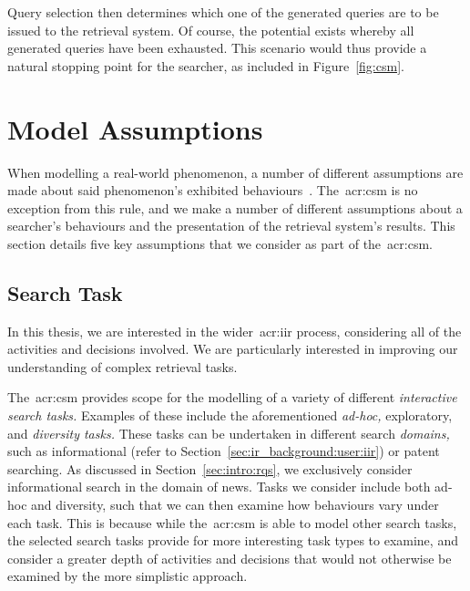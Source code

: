 Query selection then determines which one of the generated queries are to be issued to the retrieval system. Of course, the potential exists whereby all generated queries have been exhausted. This scenario would thus provide a natural stopping point for the searcher, as included in Figure~\ref{fig:csm}.

\section{Model Assumptions}\label{sec:csm:assumptions}
When modelling a real-world phenomenon, a number of different assumptions are made about said phenomenon's exhibited behaviours~\citep{fishwick1995simulation}. The~\gls{acr:csm} is no exception from this rule, and we make a number of different assumptions about a searcher's behaviours and the presentation of the retrieval system's results. This section details five key assumptions that we consider as part of the~\gls{acr:csm}.

\subsection{Search Task}\label{sec:csm:assumptions:task}
In this thesis, we are interested in the wider~\gls{acr:iir} process, considering all of the activities and decisions involved. We are particularly interested in improving our understanding of complex retrieval tasks.

The~\gls{acr:csm} provides scope for the modelling of a variety of different \emph{interactive search tasks.} Examples of these include the aforementioned \emph{ad-hoc,} exploratory, and \emph{diversity tasks.} These tasks can be undertaken in different search \emph{domains,} such as informational (refer to Section~\ref{sec:ir_background:user:iir}) or patent searching. As discussed in Section~\ref{sec:intro:rqs}, we exclusively consider informational search in the domain of news. Tasks we consider include both ad-hoc and diversity, such that we can then examine how behaviours vary under each task. This is because while the~\gls{acr:csm} is able to model other search tasks, the selected search tasks provide for more interesting task types to examine, and consider a greater depth of activities and decisions that would not otherwise be examined by the more simplistic approach.

%

